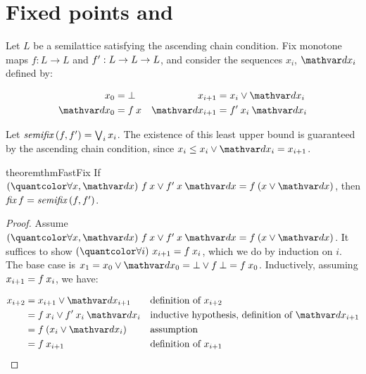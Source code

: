 
\section{Fixed points and \fastfix}
\label{sec:fastfix}

 Let $L$ be a semilattice satisfying the ascending
chain condition. Fix monotone maps $f : L \to L$ and $f' : L \to L \to L$,
and consider the sequences $x_i$, $\dx_i$ defined by:

\nopagebreak[2]
\begin{align*}
  x_0 &= \bot
  &
  x_{i+1} &= x_i \vee \dx_i\\
  \dx_0 &= f\< x
  &
  \dx_{i+1} &= \deriv f \<x_i \<\dx_i
\end{align*}

\noindent
Let $\fastfix\<(f,\deriv f) = \bigvee_i x_i$. The existence of this least upper
bound is guaranteed by the ascending chain condition, since $x_i \le x_i \vee
\dx_i = x_{i+1}$.

\begin{restatable}{theorem}{thmFastFix}\label{thm:fast-fix}
  If $\fa{x,\dx} f \<x \vee \deriv f \<x \<\dx = f \<(x \vee \dx)$,
  then \(\efix f = \fastfix\<(f,\deriv f)\).
\end{restatable}
\begin{proof}
  Assume $\fa{x,\dx} f\<x \vee \deriv f \<x \<\dx = f\<(x \vee \dx)$. It suffices
  to show $\fa{i} x_{i+1} = f \<x_i$, which we do by induction on $i$. The base
  case is $x_1 = x_0 \vee \dx_0 = \bot \vee f\<\bot = f\<x_0$. Inductively,
  assuming $x_{i+1} = f\<x_i$, we have:

  \nopagebreak[2]
  \begin{align*}
    x_{i+2} &= x_{i+1} \vee \dx_{i+1} && \text{definition of $x_{i+2}$}\\
    &= f\<x_i \vee \deriv f\<x_i\<\dx_i && \text{inductive hypothesis, definition of $\dx_{i+1}$}\\
    &= f\<(x_i \vee \dx_i) && \text{assumption}\\
    &= f\<x_{i+1} && \text{definition of $x_{i+1}$}
  \end{align*}
\end{proof}





%



